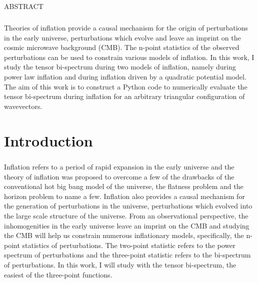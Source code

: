 \documentclass[12pt,a4paper,oneside]{book}
\begin{document}

\newpage\topskip 40pt
\thispagestyle{empty}
\centerline{\Large ABSTRACT}
\vskip 20pt\noindent 

\paragraph*{} Theories of inflation provide a causal mechanism for the 
origin of perturbations in the early universe, perturbations which evolve and 
leave an imprint on the cosmic microwave background (CMB). The n-point 
statistics of the observed perturbations can be used to constrain various models 
of inflation. In this work, I study 
the tensor bi-spectrum during two models of inflation, namely during 
power law inflation and during inflation driven by a quadratic potential model. 
The aim of this work 
is to construct a Python code to numerically evaluate the tensor bi-spectrum 
during inflation for an arbitrary triangular configuration of wavevectors.


\newpage
\thispagestyle{empty}
\tableofcontents
\newpage


\newpage
\thispagestyle{empty}
\listoffigures
\newpage




\chapter{Introduction}

\paragraph*{} Inflation refers to a period of rapid expansion in the early 
universe and the theory of inflation was proposed to overcome a few of the drawbacks 
of the conventional hot big bang model of the universe, the flatness problem 
and the horizon problem to name a few. Inflation also provides a causal mechanism 
for the generation of perturbations in the universe, perturbations which evolved 
into the large scale structure of the universe. From an observational perspective, 
the inhomogenities in the early universe leave an imprint on the CMB and studying 
the CMB will help us constrain numerous inflationary models, specifically, 
the n-point statistics of perturbations. The two-point statistic refers to the 
power spectrum of perturbations and the three-point statistic refers to the bi-spectrum 
of perturbations. In this work, I will study with the tensor bi-spectrum, the easiest of the 
three-point functions.
\end{document}
